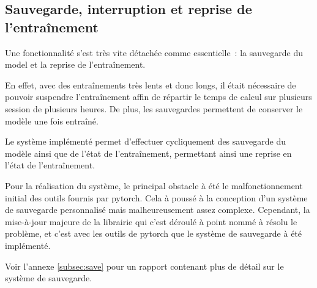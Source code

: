 \subsection{Sauvegarde, interruption et reprise de l'entraînement}\label{subsec:gmsnn_save}
Une fonctionnalité s'est très vite détachée comme essentielle~: la sauvegarde du \gls{model} et la reprise de l'entraînement.

En effet, avec des entraînements très lents et donc longs, il était nécessaire de pouvoir suspendre l'entraînement affin de répartir le temps de calcul sur plusieurs session de plusieurs heures. De plus, les sauvegardes permettent de conserver le modèle une fois entraîné.

Le système implémenté permet d'effectuer cycliquement des sauvegarde du modèle ainsi que de l'état de l'entraînement, permettant ainsi une reprise en l'état de l'entraînement.

Pour la réalisation du système, le principal obstacle à été le malfonctionnement initial des outils fournis par \gls{pytorch}.
Cela à poussé à la conception d'un système de sauvegarde personnalisé mais malheureusement assez complexe.
Cependant, la mise-à-jour majeure de la librairie qui c'est déroulé à point nommé à résolu le problème, et c'est avec les outils de \gls{pytorch} que le système de sauvegarde à été implémenté.

Voir l'annexe \ref{subsec:save} pour un rapport contenant plus de détail sur le système de sauvegarde.